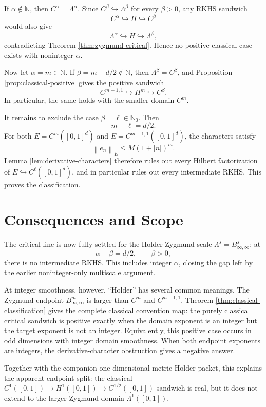 \documentclass[11pt]{article}
\newcommand{\N}{\mathbb{N}}
\newcommand{\Lam}{\Lambda}
\newcommand{\norm}[1]{\left\lVert #1\right\rVert}
\newcommand{\abs}[1]{\left\lvert #1\right\rvert}
\begin{document}
If \(\alpha\notin\N\), then \(C^\alpha=\Lam^\alpha\). Since
\(C^\beta\hookrightarrow\Lam^\beta\) for every \(\beta>0\), any RKHS
sandwich
\[
  C^\alpha\hookrightarrow H\hookrightarrow C^\beta
\]
would also give
\[
  \Lam^\alpha\hookrightarrow H\hookrightarrow\Lam^\beta,
\]
contradicting Theorem \ref{thm:zygmund-critical}. Hence no positive
classical case exists with noninteger \(\alpha\).

Now let \(\alpha=m\in\N\). If \(\beta=m-d/2\notin\N\), then
\(\Lam^\beta=C^\beta\), and Proposition \ref{prop:classical-positive} gives
the positive sandwich
\[
  C^{m-1,1}\hookrightarrow H^m\hookrightarrow C^\beta .
\]
In particular, the same holds with the smaller domain \(C^m\).

It remains to exclude the case \(\beta=\ell\in\N_0\). Then
\[
  m-\ell=d/2.
\]
For both \(E=C^m([0,1]^d)\) and \(E=C^{m-1,1}([0,1]^d)\), the characters
satisfy
\[
  \norm{e_n}_E\le M(1+\abs n)^m .
\]
Lemma \ref{lem:derivative-characters} therefore rules out every Hilbert
factorization of \(E\hookrightarrow C^\ell([0,1]^d)\), and in particular
rules out every intermediate RKHS. This proves the classification.

\section*{Consequences and Scope}

The critical line is now fully settled for the Holder-Zygmund scale
\(\Lam^s=B^s_{\infty,\infty}\): at
\[
  \alpha-\beta=d/2,\qquad \beta>0,
\]
there is no intermediate RKHS. This includes integer \(\alpha\), closing the
gap left by the earlier noninteger-only multiscale argument.

At integer smoothness, however, ``Holder'' has several common meanings. The
Zygmund endpoint \(B^m_{\infty,\infty}\) is larger than \(C^m\) and
\(C^{m-1,1}\). Theorem \ref{thm:classical-classification} gives the complete
classical convention map: the purely classical critical sandwich is positive
exactly when the domain exponent is an integer but the target exponent is not
an integer. Equivalently, this positive case occurs in odd dimensions with
integer domain smoothness. When both endpoint exponents are integers, the
derivative-character obstruction gives a negative answer.

Together with the companion one-dimensional metric Holder packet, this
explains the apparent endpoint split: the classical
\(C^1([0,1])\to H^1([0,1])\to C^{1/2}([0,1])\) sandwich is real, but it does
not extend to the larger Zygmund domain \(\Lam^1([0,1])\).
\end{document}
